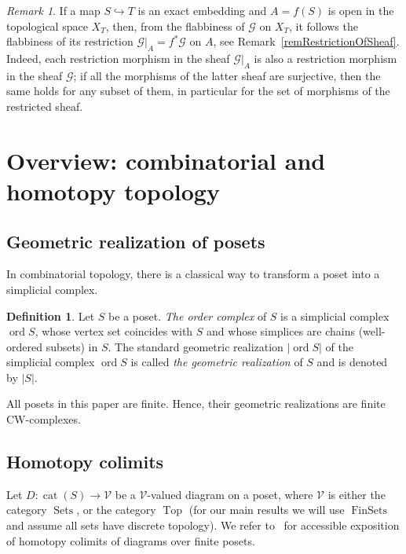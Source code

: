 \documentclass[english,12pt,oneside]{amsproc}
\DeclareMathOperator{\cat}{cat}
\DeclareMathOperator{\FinSets}{FinSets}
\DeclareMathOperator{\ord}{ord}
\DeclareMathOperator{\Sets}{Sets}
\DeclareMathOperator{\Top}{Top}
\newcommand{\ca}[1]{\mathcal{#1}}
\newcommand{\Vv}{\mathcal{V}}
\newcounter{stmcounter}[section]
\numberwithin{equation}{section}
\theoremstyle{plain}
\theoremstyle{definition}
\newtheorem{defin}[stmcounter]{Definition}
\theoremstyle{remark}
\newtheorem{rem}[stmcounter]{Remark}
\begin{document}
\begin{rem}\label{remFlabbyOnOpen}
If a map $S\hookrightarrow T$ is an exact embedding  and  $A=f(S)$ is open in the topological space $X_T$, then, from the flabbiness of $\ca{G}$ on $X_T$, it follows the flabbiness of its restriction $\ca{G}|_A=f^*\ca{G}$ on $A$, see Remark~\ref{remRestrictionOfSheaf}. Indeed, each restriction morphism in the sheaf $\ca{G}|_A$ is also a restriction morphism in the sheaf $\ca{G}$; if all the morphisms of the latter sheaf are surjective, then the same holds for any subset of them, in particular for the set of morphisms of the restricted sheaf.
\end{rem}


\section{Overview: combinatorial and homotopy topology}\label{secOverviewCombTop}

\subsection{Geometric realization of posets}

In combinatorial topology, there is a classical way to transform a poset into a simplicial complex.

\begin{defin}
Let $S$ be a poset. \emph{The order complex} of $S$ is a simplicial complex $\ord S$, whose vertex set coincides with $S$  and  whose simplices are chains  (well-ordered subsets) in $S$. The standard geometric realization $|\ord S|$ of the simplicial complex $\ord S$ is called \emph{the geometric realization} of $S$  and  is denoted by $|S|$.
\end{defin}

All posets in this paper are finite. Hence, their geometric realizations are finite CW-complexes.

\subsection{Homotopy colimits}

Let $D\colon \cat(S)\to \Vv$ be a $\Vv$-valued diagram on a poset, where $\Vv$ is either the category $\Sets$, or the category $\Top$ (for our main results we will use $\FinSets$ and assume all sets have discrete topology). We refer to~\cite{WZZ} for accessible exposition of homotopy colimits of diagrams over finite posets.
\end{document}

